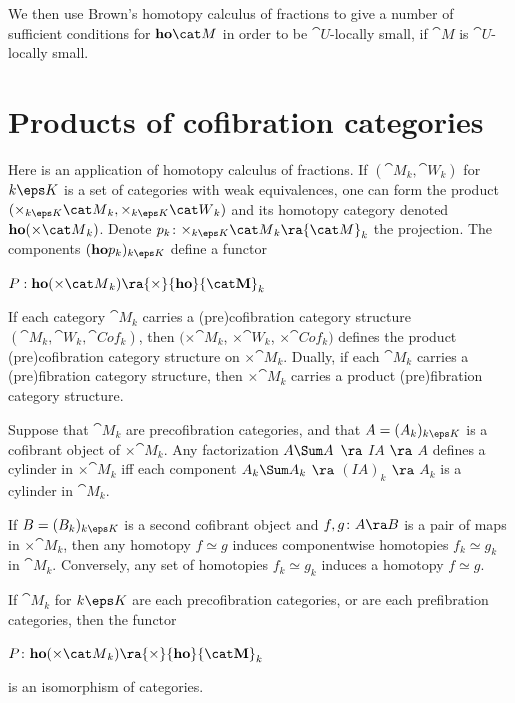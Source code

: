 We then use Brown's homotopy calculus of fractions to give a number of sufficient conditions for ${\bf ho}{\cat M}$ in order to be ${\cat U}$-locally small, if ${\cat M}$ is ${\cat U}$-locally small.

\section{Products of cofibration categories}
\label{chap:prodcofcat}
Here is an application of homotopy calculus of fractions. If $({\cat M}_k, {\cat W}_k)$ for $k \eps K$ is a set of categories with weak equivalences, one can form the product $({\times}_{k \eps K} {\cat M}_k, {\times}_{k \eps K} {\cat W}_k)$ and its homotopy category denoted ${\bf ho}({\times} {\cat M}_k)$. Denote $p_k \colon {\times}_{k \eps K} {\cat M}_k \ra {\cat M}_k$ the projection. The components $({\bf ho}p_k)_{k \eps K}$ define a functor
\begin{center}
$P :{\bf ho}({\times} {\cat M}_k) \ra {\times}{\bf ho}{\cat M}_k$
\end{center}
If each category ${\cat M}_k$ carries a (pre)cofibration category structure $({\cat M}_k, {\cat W}_k, {\cat Cof}_k)$, then $(\times{\cat M}_k$, $\times{\cat W}_k$, $\times{\cat Cof}_k)$ defines the product (pre)cofibration category structure on ${\times} {\cat M}_k$. Dually, if each ${\cat M}_k$ carries a (pre)fibration category structure, then ${\times} {\cat M}_k$ carries a product (pre)fibration category structure.

Suppose that ${\cat M}_k$ are precofibration categories, and that $A = (A_k)_{k \eps K}$ is a cofibrant object of $\times {\cat M}_k$. Any factorization $A \Sum A$ $\ra$ $IA$ $\ra$ $A$ defines a cylinder in $\times {\cat M}_k$ iff each component $A_k \Sum A_k$ $\ra$ $(IA)_k$ $\ra$ $A_k$ is a cylinder in ${\cat M}_k$. 

If $B = (B_k)_{k \eps K}$ is a second cofibrant object and $f, g \colon A \ra B$ is a pair of maps in $\times {\cat M}_k$, then any homotopy $f \simeq g$ induces componentwise homotopies $f_k \simeq g_k$ in ${\cat M}_k$. Conversely, any set of homotopies $f_k \simeq g_k$ induces a homotopy $f \simeq g$.

\begin{thm}
\label{thm:prodhomotopycat}
If ${\cat M}_k$ for $k \eps K$ are each precofibration categories, or are each prefibration categories, then the functor
\begin{center}
$P \colon {\bf ho}({\times} {\cat M}_k) \ra {\times}{\bf ho}{\cat M}_k$
\end{center}
is an isomorphism of categories.
\end{thm}


